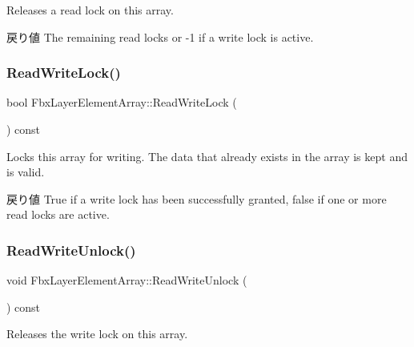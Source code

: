 Releases a read lock on this array. \begin{DoxyReturn}{戻り値}
The remaining read locks or -\/1 if a write lock is active. 
\end{DoxyReturn}
\mbox{\label{class_fbx_layer_element_array_ab4293e9a5089b1bccdb2843ee6ff30fb}} 
\subsubsection{\texorpdfstring{Read\+Write\+Lock()}{ReadWriteLock()}}
{\footnotesize\ttfamily bool Fbx\+Layer\+Element\+Array\+::\+Read\+Write\+Lock (\begin{DoxyParamCaption}{ }\end{DoxyParamCaption}) const}

Locks this array for writing. The data that already exists in the array is kept and is valid. \begin{DoxyReturn}{戻り値}
{\ttfamily True} if a write lock has been successfully granted, {\ttfamily false} if one or more read locks are active. 
\end{DoxyReturn}
\mbox{\label{class_fbx_layer_element_array_a172d8f3872d50f7dfcdfd8f446cdcf3c}} 
\subsubsection{\texorpdfstring{Read\+Write\+Unlock()}{ReadWriteUnlock()}}
{\footnotesize\ttfamily void Fbx\+Layer\+Element\+Array\+::\+Read\+Write\+Unlock (\begin{DoxyParamCaption}{ }\end{DoxyParamCaption}) const}

Releases the write lock on this array. \mbox{\label{class_fbx_layer_element_array_a574fce5860ae84a77c15d18bf3a2cd87}} 
